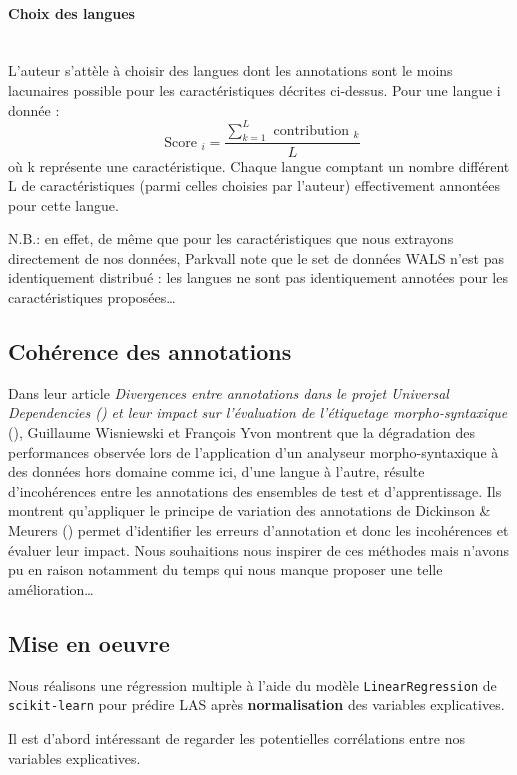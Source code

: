 \documentclass[a4paper, twoside, 12pt]{article}
\newcommand{\myparagraph}[1]{\paragraph{#1}\mbox{}\\}
\begin{document}
    \myparagraph{Choix des langues}

    L’auteur s’attèle à choisir des langues dont les annotations sont le moins lacunaires possible pour les caractéristiques décrites ci-dessus. Pour une langue i donnée :
    \begin{equation}
        \text { Score }_{i}=\frac{\sum_{k=1}^{L} \text { contribution }_{k}}{L}
    \end{equation}
    où k représente une caractéristique. Chaque langue comptant un nombre différent L de caractéristiques (parmi celles choisies par l'auteur) effectivement annontées pour cette langue. \par
    N.B.: en effet, de même que pour les caractéristiques que nous extrayons directement de nos données, Parkvall note que le set de données WALS n’est pas identiquement distribué : les langues ne sont pas identiquement annotées pour les caractéristiques proposées…

    \subsection{Cohérence des annotations}

    Dans leur article \textit{Divergences entre annotations dans le projet Universal Dependencies (\cite{nivre}) et leur impact sur l’évaluation de l’étiquetage morpho-syntaxique} (\cite{wisniewski}), Guillaume Wisniewski et François Yvon montrent que la dégradation des performances observée lors de l’application d’un analyseur morpho-syntaxique à des données hors domaine comme ici, d'une langue à l'autre, résulte d’incohérences entre les annotations des ensembles de test et d’apprentissage. Ils montrent qu'appliquer le principe de variation des annotations de Dickinson \& Meurers (\cite{meueres}) permet d'identifier les erreurs d’annotation et donc les incohérences et évaluer leur impact. Nous souhaitions nous inspirer de ces méthodes mais n'avons pu en raison notamment du temps qui nous manque proposer une telle amélioration\ldots


    \subsection{Mise en oeuvre}

    Nous réalisons une régression multiple à l'aide du modèle \texttt{LinearRegression} de \texttt{scikit-learn} pour prédire LAS après \textbf{normalisation} des variables explicatives.

    Il est d'abord intéressant de regarder les potentielles corrélations entre nos variables explicatives.
\end{document}
